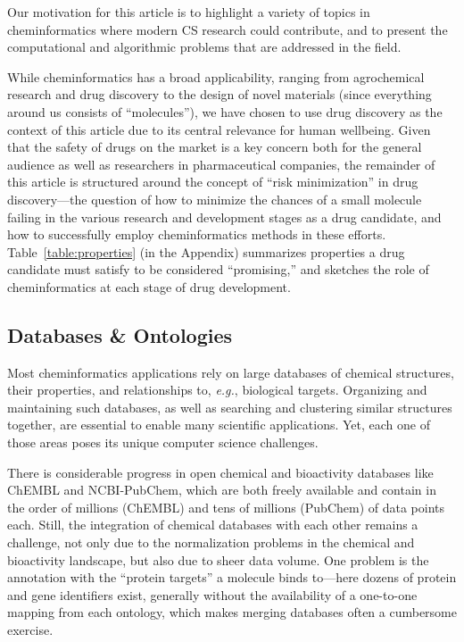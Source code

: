 \documentclass{sig-alternate}
\begin{document}
Our motivation for this article is to highlight a variety of topics in
cheminformatics where modern CS research could contribute, and
to present the computational and algorithmic problems
that are addressed in the field.

While cheminformatics has a broad applicability, ranging from
agrochemical research and drug discovery to the design of novel
materials (since everything around us consists of ``molecules''), we have chosen to use drug discovery as the context of
this
article due to its central relevance for human wellbeing. Given that the safety of drugs on the market is a key concern
both for the general audience as well as researchers in pharmaceutical companies, the remainder of this article is
structured around the
concept of ``risk minimization'' in drug discovery---the question of how to minimize the chances of a small molecule
failing in the various research and development stages as a drug candidate, and how to successfully employ
cheminformatics methods in these efforts.  Table~\ref{table:properties} (in the Appendix) summarizes properties a drug candidate must satisfy to be considered ``promising,'' and sketches the role of cheminformatics at each stage of drug development.
%
\subsection{Databases \& Ontologies}
\label{sec:databases}
%
Most cheminformatics applications rely on large databases of chemical structures,
their properties, and relationships to, \textit{e.g.}, biological targets.
Organizing and maintaining such databases, as well as searching and clustering similar structures together,
are essential  to enable many scientific applications. Yet, each one of
those areas poses its unique computer science challenges.

There is considerable progress in open chemical and bioactivity databases like
ChEMBL and NCBI-PubChem, which are both freely available and contain in the order of millions (ChEMBL) and tens of
millions (PubChem) of data points each. Still, the integration
of chemical databases with each other remains a challenge, not only due to the
normalization problems in the chemical and bioactivity landscape, but also due
to sheer data volume. One problem is the annotation with the ``protein targets'' a molecule binds to---here dozens of
protein and gene identifiers exist, generally without the availability of a one-to-one mapping from each ontology, which makes merging databases often a cumbersome exercise.
\end{document}
